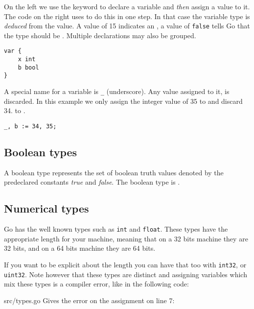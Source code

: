 On the left we use the
 keyword to declare a variable and \emph{then} assign a value to
it. The code on the right uses \mbox{\key{:=}{ }} to do this in one step. 
In that case the variable
type is \emph{deduced} from the value. A value of 15 indicates an ,
a value of \texttt{false} tells Go that the type should be . 
Multiple  declarations may also be grouped.
\begin{lstlisting}
var {
    x int
    b bool
}
\end{lstlisting}

A special name for a variable is \texttt{\_} (underscore). Any value
assigned to it, is discarded. In this example we only assign the integer
value of 35 to and discard 34.
to .
\begin{lstlisting}
_, b := 34, 35;
\end{lstlisting}


\subsection{Boolean types}
A boolean type represents the set of boolean truth values denoted by the
predeclared constants \emph{true} and \emph{false}. The boolean type is .

\subsection{Numerical types}
Go has the well known types such as \lstinline{int} and
\lstinline{float}. These types have the appropriate length for your
machine, meaning that on a 32 bits machine they are 32 bits, and on
a 64 bits machine they are 64 bits.

If you want to be explicit about the length you can have
that too with \lstinline{int32}, or \lstinline{uint32}. Note however
that these types are distinct and assigning variables which mix
these types is a compiler error, like in the following code:


{src/types.go}
Gives the error on the assignment on line 7:

\noindent{}

